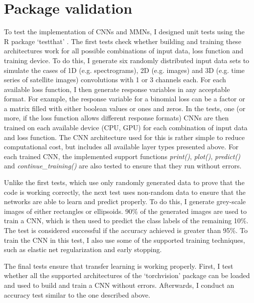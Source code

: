 \documentclass[12pt,twoside]{scrreport}
\newcommand{\pkg}[1]{`#1'}
\newcommand{\fn}[2][]{\textit{#2(}#1\textit{)}}
\begin{document}

\section*{Package validation}
To test the implementation of CNNs and MMNs, I designed unit tests using the R package \pkg{testthat} \citep{wickhamTestthatGetStarted2011}. The first tests check whether building and training these architectures work for all possible combinations of input data, loss function and training device. To do this, I generate six randomly distributed input data sets to simulate the cases of 1D (e.g. spectrograms), 2D (e.g. images) and 3D (e.g. time series of satellite images) convolutions with 1 or 3 channels each. For each available loss function, I then generate response variables in any acceptable format. For example, the response variable for a binomial loss can be a factor or a matrix filled with either boolean values or ones and zeros. In the tests, one (or more, if the loss function allows different response formats) CNNs are then trained on each available device (CPU, GPU) for each combination of input data and loss function. The CNN architecture used for this is rather simple to reduce computational cost, but includes all available layer types presented above. For each trained CNN, the implemented support functions \fn{print}, \fn{plot}, \fn{predict} and \fn{continue\_training} are also tested to ensure that they run without errors.

Unlike the first tests, which use only randomly generated data to prove that the code is working correctly, the next test uses non-random data to ensure that the networks are able to learn and predict properly. To do this, I generate grey-scale images of either rectangles or ellipsoids. 90\% of the generated images are used to train a CNN, which is then used to predict the class labels of the remaining 10\%. The test is considered successful if the accuracy achieved is greater than 95\%. To train the CNN in this test, I also use some of the supported training techniques, such as elastic net regularization and early stopping.

The final tests ensure that transfer learning is working properly. First, I test whether all the supported architectures of the \pkg{torchvision} package can be loaded and used to build and train a CNN without errors. Afterwards, I conduct an accuracy test similar to the one described above.
\end{document}
